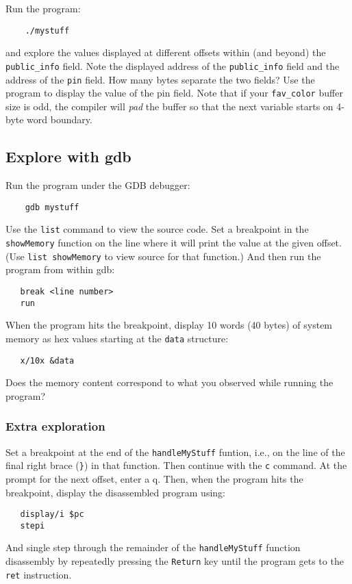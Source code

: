 Run the program:
\begin{verbatim}
    ./mystuff
\end{verbatim}
\noindent and explore the values displayed at different offsets within (and beyond) the {\tt public\_info} field.
Note the displayed address of the {\tt public\_info} field and the address of the {\tt pin} field.  How many 
bytes separate the two fields?  Use the program to display the value of the pin field.  Note that if
your {\tt fav\_color} buffer size is odd, the compiler will \textit{pad} the buffer so that the next
variable starts on 4-byte word boundary.

\subsection{Explore with gdb}
Run the program under the GDB debugger:
\begin{verbatim}
    gdb mystuff
\end{verbatim}
\noindent Use the {\tt list} command to view the source code.  Set a breakpoint in the {\tt showMemory} 
function on the line where it will print the value at the given offset. (Use {\tt list showMemory} to view
source for that function.)  And then run the program from within
gdb:
\begin{verbatim}
   break <line number>
   run
\end{verbatim}
\noindent When the program hits the breakpoint, display 10 words (40 bytes) of system memory as hex
values starting at the {\tt data} structure:
\begin{verbatim}
   x/10x &data
\end{verbatim}
Does the memory content correspond to what you observed while running the program?

\subsubsection{Extra exploration}
Set a breakpoint at the end of the {\tt handleMyStuff} funtion, i.e., on the line of the final right brace
({\tt\}}) in that function.  Then continue with the {\tt c} command.  At the prompt for the next offset,
enter a q.  Then, when the program hits the breakpoint, display the disassembled program using:
\begin{verbatim}
   display/i $pc
   stepi
\end{verbatim}
\noindent And single step through the remainder of the {\tt handleMyStuff} function disassembly by
repeatedly pressing the {\tt Return} key until the program gets to the {\tt ret} instruction.

